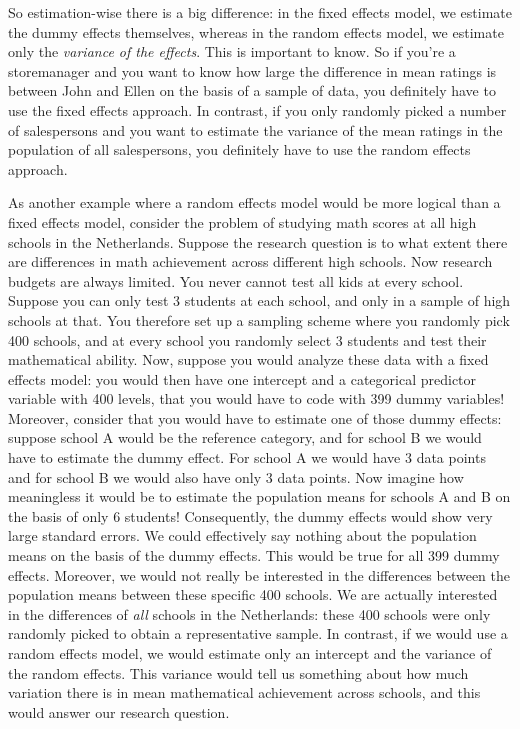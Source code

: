 So estimation-wise there is a big difference: in the fixed effects model, we estimate the dummy effects themselves, whereas in the random effects model, we estimate only the \textit{variance of the effects}. This is important to know. So if you're a storemanager and you want to know how large the difference in mean ratings is between John and Ellen on the basis of a sample of data, you definitely have to use the fixed effects approach. In contrast, if you only randomly picked a number of salespersons and you want to estimate the variance of the mean ratings in the population of all salespersons, you definitely have to use the random effects approach.


As another example where a random effects model would be more logical than a fixed effects model, consider the problem of studying math scores at all high schools in the Netherlands. Suppose the research question is to what extent there are differences in math achievement across different high schools. Now research budgets are always limited. You never cannot test all kids at every school. Suppose you can only test 3 students at each school, and only in a sample of high schools at that. You therefore set up a sampling scheme where you randomly pick 400 schools, and at every school you randomly select 3 students and test their mathematical ability. Now, suppose you would analyze these data with a fixed effects model: you would then have one intercept and a categorical predictor variable with 400 levels, that you would have to code with 399 dummy variables! Moreover, consider that you would have to estimate one of those dummy effects: suppose school A would be the reference category, and for school B we would have to estimate the dummy effect. For school A we would have 3 data points and for school B we would also have only 3 data points. Now imagine how meaningless it would be to estimate the population means for schools A and B on the basis of only 6 students! Consequently, the dummy effects would show very large standard errors. We could effectively say nothing about the population means on the basis of the dummy effects. This would be true for all 399 dummy effects. Moreover, we would not really be interested in the differences between the population means between these specific 400 schools. We are actually interested in the differences of \textit{all} schools in the Netherlands: these 400 schools were only randomly picked to obtain a representative sample. In contrast, if we would use a random effects model, we would estimate only an intercept and the variance of the random effects. This variance would tell us something about how much variation there is in mean mathematical achievement across schools, and this would answer our research question.

